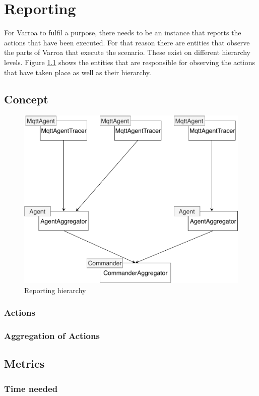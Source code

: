 \chapter{Reporting}
For Varroa to fulfil a purpose, there needs to be an instance that reports the actions that have been executed.
For that reason there are entities that observe the parts of Varroa that execute the scenario.
These exist on different hierarchy levels.
Figure \ref{fig:ReportMapping} shows the entities that are responsible for observing the actions that have taken place as well as their hierarchy.

\section{Concept}
\begin{figure}[H]
	\begin{center}
		\includegraphics[scale=0.8]{Resources/PDF/ReportMapping}
		\caption{Reporting hierarchy}
		\label{fig:ReportMapping}
	\end{center}
\end{figure}




\subsection{Actions}

\subsection{Aggregation of Actions}

\section{Metrics}

\subsection{Time needed}



